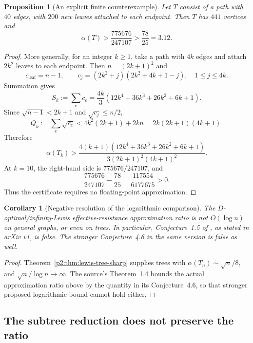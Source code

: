\documentclass[11pt,a4paper]{article}
\newtheorem{proposition}[theorem]{Proposition}
\newtheorem{corollary}[theorem]{Corollary}
\theoremstyle{definition}
\theoremstyle{remark}
\numberwithin{equation}{section}
\begin{document}
\begin{proposition}[An explicit finite counterexample]
\label{p2:prop:lewis-441}
Let $T$ consist of a path with $40$ edges, with $200$ new leaves
attached to each endpoint.  Then $T$ has $441$ vertices and
\[
 \alpha(T)>\frac{775676}{247107}>\frac{78}{25}=3.12.
\]
\end{proposition}

\begin{proof}
More generally, for an integer $k\geq1$, take a path with $4k$ edges
and attach $2k^2$ leaves to each endpoint.  Then $n=(2k+1)^2$ and
\[
 c_{\mathrm{leaf}}=n-1,
 \qquad
 c_j=(2k^2+j)(2k^2+4k+1-j),\quad 1\leq j\leq4k.
\]
Summation gives
\[
 S_k:=\sum_ec_e
 =\frac{4k}{3}(12k^4+36k^3+26k^2+6k+1).
\]
Since $\sqrt{n-1}<2k+1$ and $\sqrt{c_j}\leq n/2$,
\[
 Q_k:=\sum_e\sqrt{c_e}
 <4k^2(2k+1)+2kn
 =2k(2k+1)(4k+1).
\]
Therefore
\begin{equation}\label{p2:eq:lewis-rational-certificate}
 \alpha(T_k)>
 \frac{4(k+1)(12k^4+36k^3+26k^2+6k+1)}
      {3(2k+1)^2(4k+1)^2}.
\end{equation}
At $k=10$, the right-hand side is $775676/247107$, and
\[
 \frac{775676}{247107}-\frac{78}{25}
 =\frac{117554}{6177675}>0.
\]
Thus the certificate requires no floating-point approximation.
\end{proof}

\begin{corollary}[Negative resolution of the logarithmic comparison]
\label{p2:cor:lewis-conjecture-negative}
The $D$-optimal/infinity-Lewis effective-resistance approximation ratio
is not $O(\log n)$ on general graphs, or even on trees.
In particular, Conjecture~1.5 of
\cite{p2:SulimanWeinstein2023}, as stated in arXiv v1, is false.
The stronger Conjecture~4.6 in the same version is false as well.
\end{corollary}

\begin{proof}
Theorem~\ref{p2:thm:lewis-tree-sharp} supplies trees with
$\alpha(T_n)\sim\sqrt n/8$, and $\sqrt n/\log n\to\infty$.
The source's Theorem~1.4 bounds the actual approximation ratio above
by the quantity in its Conjecture~4.6, so that stronger proposed
logarithmic bound cannot hold either.
\end{proof}

\subsection{The subtree reduction does not preserve the ratio}
\end{document}
